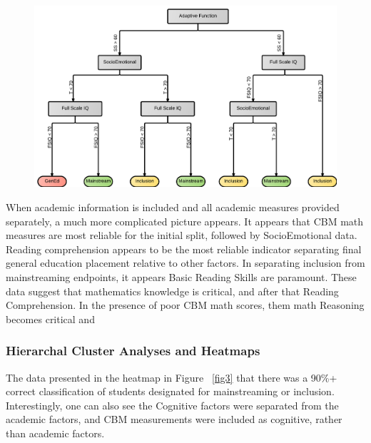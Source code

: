 \documentclass[twoside]{article}
\begin{document}
%
%
%
%
\begin{figure}[htp!]
	\centering
	\includegraphics[width=\textwidth]{RegressionTree_NOAcademics.png}
	\caption[Mainstreaming Decision Tree]{\textit{          }}
	\label{fig5}
\end{figure}
%
%
%
%
When academic information is included and all academic measures provided separately, a much more complicated picture appears. It appears that CBM math measures are most reliable for the initial split, followed by SocioEmotional data. Reading comprehension appears to be the most reliable indicator separating final general education placement relative to other factors. In separating inclusion from mainstreaming endpoints, it appears Basic Reading Skills are paramount. These data suggest that mathematics knowledge is critical, and after that Reading Comprehension. In the presence of poor CBM math scores, them math Reasoning becomes critical and  


\subsubsection{Hierarchal Cluster Analyses and Heatmaps}

The data presented in the heatmap in Figure ~\ref{fig3} that there was a 90\%+ correct classification of students designated for mainstreaming or inclusion. Interestingly, one can also see the Cognitive factors were separated from the academic factors, and CBM measurements were included as cognitive, rather than academic factors. 
\end{document}
